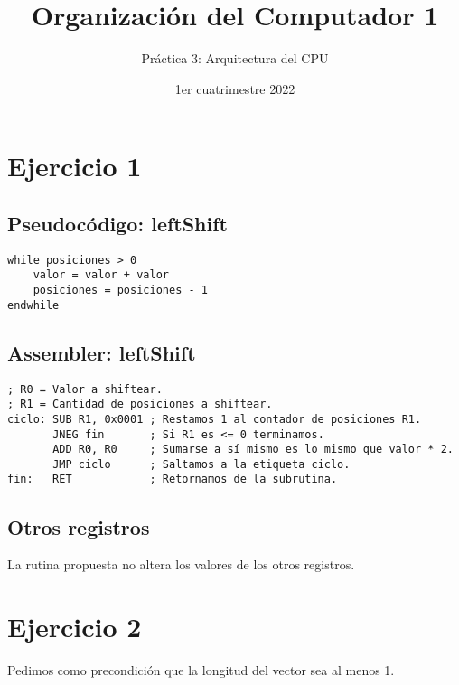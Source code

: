 

\title{Organización del Computador 1}
\author{Práctica 3: Arquitectura del CPU}
\date{1er cuatrimestre 2022}



\maketitle
\tableofcontents
\newpage

\section{Ejercicio 1}

\subsection{Pseudocódigo: leftShift}

\begin{lstlisting}
while posiciones > 0
    valor = valor + valor
    posiciones = posiciones - 1
endwhile
\end{lstlisting}

\subsection{Assembler: leftShift}

\begin{lstlisting}
; R0 = Valor a shiftear.
; R1 = Cantidad de posiciones a shiftear.
ciclo: SUB R1, 0x0001 ; Restamos 1 al contador de posiciones R1.
       JNEG fin       ; Si R1 es <= 0 terminamos.
       ADD R0, R0     ; Sumarse a sí mismo es lo mismo que valor * 2.
       JMP ciclo      ; Saltamos a la etiqueta ciclo.
fin:   RET            ; Retornamos de la subrutina.
\end{lstlisting}

\subsection{Otros registros}

La rutina propuesta no altera los valores de los otros registros.

\section{Ejercicio 2}

Pedimos como precondición que la longitud del vector sea al menos 1.

